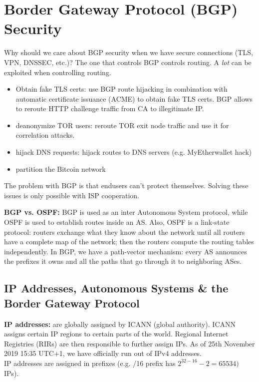 \documentclass[11pt,oneside,a4paper]{article}
\begin{document}
\section{Border Gateway Protocol (BGP) Security}

Why should we care about BGP security when we have secure connections (TLS, VPN, DNSSEC, etc.)? The one that controls BGP controls routing. A \textit{lot} can be exploited when controlling routing.

\vspace{-\topsep}
\begin{itemize}
	\setlength{\itemsep}{0pt}
	\setlength{\parskip}{0pt}
	\item Obtain fake TLS certs: use BGP route hijacking in combination with automatic certificate issuance (ACME) to obtain fake TLS certs. BGP allows to reroute HTTP challenge traffic from CA to illegitimate IP.
	\item deanonymize TOR users: reroute TOR exit node traffic and use it for correlation attacks.
	\item hijack DNS requests: hijack routes to DNS servers (e.g. MyEtherwallet hack)
	\item partition the Bitcoin network
\end{itemize}
\vspace{-\topsep}

\noindent The problem with BGP is that endusers can't protect themselves. Solving these issues is only possible with ISP cooperation.

\newpage

\noindent \textbf{BGP vs. OSPF:} BGP is used as an inter Autonomous System protocol, while OSPF is used to establish routes inside an AS. Also, OSPF is a link-state protocol: routers exchange what they know about the network until all routers have a complete map of the network; then the routers compute the routing tables independently. In BGP, we have a path-vector mechanism: every AS announces the prefixes it owns and all the paths that go through it to neighboring ASes.

\subsection{IP Addresses, Autonomous Systems \& the Border Gateway Protocol}

\textbf{IP addresses:} are globally assigned by ICANN (global authority). ICANN assigns certain IP regions to certain parts of the world. Regional Internet Registries (RIRs) are then responsible to further assign IPs. As of 25th November 2019 15:35 UTC+1, we have officially run out of IPv4 addresses.\\
IP addresses are assigned in prefixes (e.g. /16 prefix has $2^{32-16} - 2= 65534)$ IPs).\\
\end{document}
